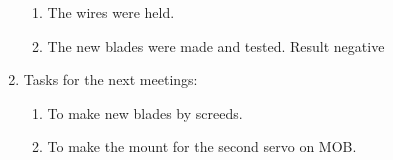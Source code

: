 \begin{enumerate}
\begin{enumerate}
		\item The wires were held.
		
		\item The new blades were made and tested. Result negative
		
	\end{enumerate}
	
	\item Tasks for the next meetings:
	\begin{enumerate}
		
		\item To make new blades by screeds.
		
		\item To make the mount for the second servo on MOB.
			
	\end{enumerate}
\end{enumerate}
\fillpage